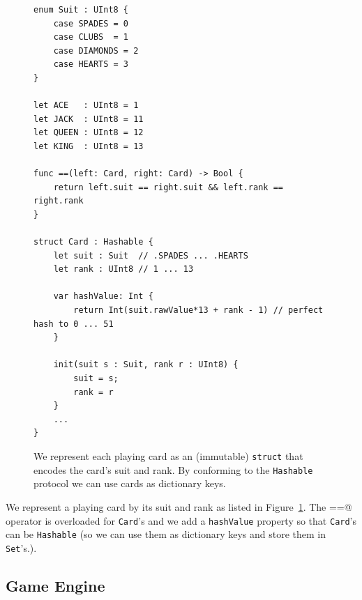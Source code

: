 \documentclass[11pt]{article}
\begin{document}
\begin{figure}[ht!]
\begin{center}
\begin{verbatim}
enum Suit : UInt8 {
    case SPADES = 0
    case CLUBS  = 1
    case DIAMONDS = 2
    case HEARTS = 3
}

let ACE   : UInt8 = 1
let JACK  : UInt8 = 11
let QUEEN : UInt8 = 12
let KING  : UInt8 = 13

func ==(left: Card, right: Card) -> Bool {
    return left.suit == right.suit && left.rank == right.rank
}

struct Card : Hashable {
    let suit : Suit  // .SPADES ... .HEARTS 
    let rank : UInt8 // 1 ... 13
    
    var hashValue: Int {
        return Int(suit.rawValue*13 + rank - 1) // perfect hash to 0 ... 51
    }
    
    init(suit s : Suit, rank r : UInt8) {
        suit = s;
        rank = r
    }
    ...
}
\end{verbatim}
\caption{We represent each playing card as an (immutable) {\tt struct} that encodes 
  the card's suit and rank. By conforming to the {\tt Hashable} protocol 
  we can use cards as dictionary keys.}
\label{fig:Card}
\end{center}
\end{figure}

We represent a playing card by its suit and rank as listed in Figure~\ref{fig:Card}.
The \verb@==@ operator is overloaded for {\tt Card}'s and we add a {\tt hashValue}
property so that {\tt Card}'s can be {\tt Hashable} (so we can use them as dictionary keys
and store them in {\tt Set}'s.).

\subsection{Game Engine}
\end{document}
